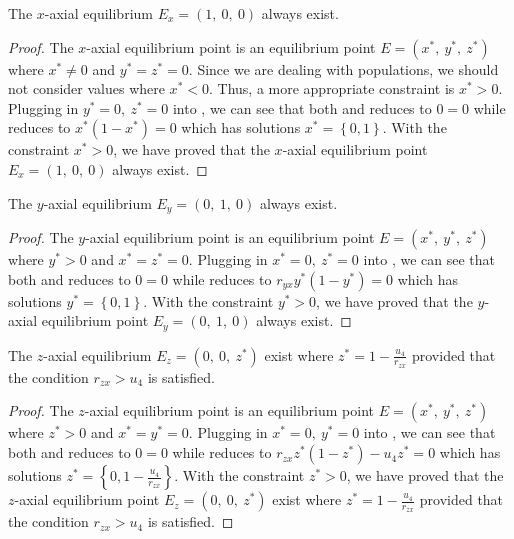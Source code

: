 \begin{theorem}\label{thm:axial-x-exist}
    The $x$-axial equilibrium $E_x=\left(1,\ 0,\ 0\right)$ always exist.
\end{theorem}
\begin{proof}
    The $x$-axial equilibrium point is an equilibrium point $E=\left(x^*,\ y^*,\ z^*\right)$ where $x^*\neq0$ and $y^*=z^*=0$. Since we are dealing with populations, we should not consider values where $x^*<0$. Thus, a more appropriate constraint is $x^*>0$. Plugging in $y^*=0,\ z^*=0$ into , we can see that both  and  reduces to $0=0$ while  reduces to $x^*\left(1-x^*\right)=0$ which has solutions $x^*=\left\{0,1\right\}$. With the constraint $x^*>0$, we have proved that the $x$-axial equilibrium point $E_x=\left(1,\ 0,\ 0\right)$ always exist.
\end{proof}

\begin{theorem}\label{thm:axial-y-exist}
    The $y$-axial equilibrium $E_y=\left(0,\ 1,\ 0\right)$ always exist.
\end{theorem}
\begin{proof}
    The $y$-axial equilibrium point is an equilibrium point $E=\left(x^*,\ y^*,\ z^*\right)$ where $y^*>0$ and $x^*=z^*=0$. Plugging in $x^*=0,\ z^*=0$ into , we can see that both  and  reduces to $0=0$ while  reduces to $r_{yx}y^*\left(1-y^*\right)=0$ which has solutions $y^*=\left\{0,1\right\}$. With the constraint $y^*>0$, we have proved that the $y$-axial equilibrium point $E_y=\left(0,\ 1,\ 0\right)$ always exist.
\end{proof}

\begin{theorem}\label{thm:axial-z-exist}
    The $z$-axial equilibrium $E_z=\left(0,\ 0,\ z^*\right)$ exist where $z^* = 1-\frac{u_4}{r_{zx}}$ provided that the condition $r_{zx} > u_4$ is satisfied.
\end{theorem}
\begin{proof}
    The $z$-axial equilibrium point is an equilibrium point $E=\left(x^*,\ y^*,\ z^*\right)$ where $z^*>0$ and $x^*=y^*=0$. Plugging in $x^*=0,\ y^*=0$ into , we can see that both  and  reduces to $0=0$ while  reduces to $r_{zx}z^*\left(1-z^*\right)-u_4z^*=0$ which has solutions $z^*=\left\{0,1-\frac{u_4}{r_{zx}}\right\}$. With the constraint $z^*>0$, we have proved that the $z$-axial equilibrium point $E_z=\left(0,\ 0,\ z^*\right)$ exist where $z^* = 1-\frac{u_4}{r_{zx}}$ provided that the condition $r_{zx} > u_4$ is satisfied.
\end{proof}

